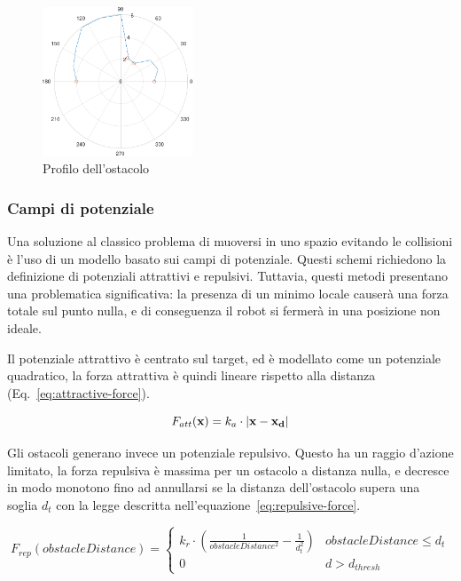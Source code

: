 \documentclass[a4paper]{article}
\begin{document}
	\begin{figure}[H]
		\centering
		\includegraphics[width=0.4\textwidth]{./img/bug.pdf}
		\caption{Profilo dell'ostacolo}
		\label{fig:bug}
	\end{figure}

	\subsubsection{Campi di potenziale}\label{subsec:Campi-di-potenziale}
	
	Una soluzione al classico problema di muoversi in uno spazio evitando le
	collisioni è l'uso di un modello basato sui campi di potenziale. Questi
	schemi richiedono la definizione di potenziali attrattivi e repulsivi.
	Tuttavia, questi metodi presentano una problematica significativa: la
	presenza di un minimo locale causerà una forza totale sul punto nulla, e di
	conseguenza il robot si fermerà in una posizione non ideale. 
	
	Il potenziale attrattivo è centrato sul target, ed è modellato come un
	potenziale quadratico, la forza attrattiva è quindi lineare rispetto alla
	distanza (Eq.~\ref{eq:attractive-force}).

	\begin{equation}\label{eq:attractive-force}
		F_{att}( \textbf{x}) = k_a\cdot \left| {\bf x - x_d} \right| 
	\end{equation}


	Gli ostacoli generano invece un potenziale repulsivo. Questo ha un raggio
	d'azione limitato, la forza repulsiva è massima per un ostacolo a distanza
	nulla, e decresce in modo monotono fino ad annullarsi se la distanza
	dell'ostacolo supera una soglia $d_t$ con la legge descritta
	nell'equazione~\ref{eq:repulsive-force}.

	\begin{equation}\label{eq:repulsive-force}
		F_{rep}(obstacleDistance) = \begin{cases}
			k_r \cdot \left(
				\frac{1}{obstacleDistance^2}-
				\frac{1}{d_t^2}
			\right)  & obstacleDistance \leq d_{t} \\
			0 & d > d_{thresh}
		\end{cases}
	\end{equation}
\end{document}
